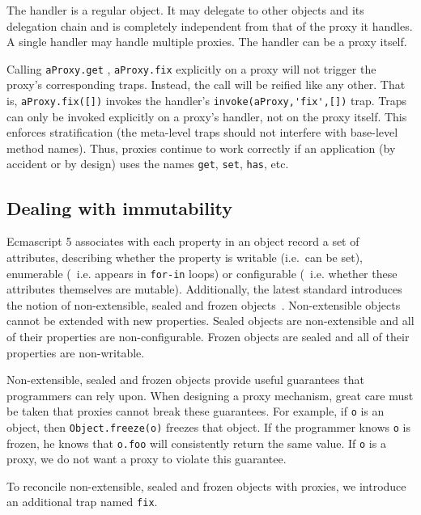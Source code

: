 \documentclass{acm_proc_article-sp}
\begin{document}
The handler is a regular object. It may delegate to other objects and its delegation chain and is completely independent from that of the proxy it handles. A single handler may handle multiple proxies. The handler can be a proxy itself.

Calling \lstinline{aProxy.get} , \lstinline{aProxy.fix} explicitly on a proxy will not trigger the proxy’s corresponding traps. Instead, the call will be reified like any other. That is, \lstinline{aProxy.fix([])} invokes the handler’s \lstinline{invoke(aProxy,'fix',[])} trap. Traps can only be invoked explicitly on a proxy’s handler, not on the proxy itself. This enforces stratification (the meta-level traps should not interfere with base-level method names). Thus, proxies continue to work correctly if an application (by accident or by design) uses the names \texttt{get}, \texttt{set}, \texttt{has}, etc.


\subsection{Dealing with immutability}

Ecmascript 5 associates with each property in an object record a set of attributes, describing whether the property is writable (i.e.~can be set), enumerable (~i.e. appears in \texttt{for-in} loops) or configurable (~i.e. whether these attributes themselves are mutable). Additionally, the latest standard introduces the notion of non-extensible, sealed and frozen objects~\cite{ecma262}. Non-extensible objects cannot be extended with new properties. Sealed objects are non-extensible and all of their properties are non-configurable. Frozen objects are sealed and all of their properties are non-writable.

Non-extensible, sealed and frozen objects provide useful guarantees that programmers can rely upon. When designing a proxy mechanism, great care must be taken that proxies cannot break these guarantees. For example, if \texttt{o} is an object, then \texttt{Object.freeze(o)} freezes that object. If the programmer knows \texttt{o} is frozen, he knows that \texttt{o.foo} will consistently return the same value. If \texttt{o} is a proxy, we do not want a proxy to violate this guarantee.

To reconcile non-extensible, sealed and frozen objects with proxies, we introduce an additional trap named \texttt{fix}.
\end{document}

